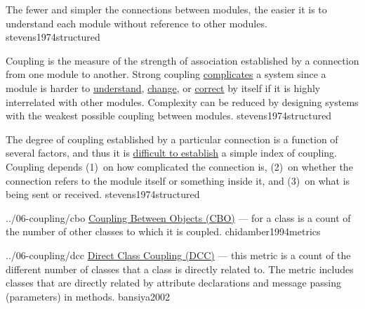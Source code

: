 \documentclass{article}
\begin{document}

  {The fewer and simpler the connections between modules, the easier it is to understand each module without reference to other modules.}
  {stevens1974structured}


  {Coupling is the measure of the strength of association established by a connection from one module to another. Strong coupling \ul{complicates} a system since a module is harder to \ul{understand}, \ul{change}, or \ul{correct} by itself if it is highly interrelated with other modules. Complexity can be reduced by designing systems with the weakest possible coupling between modules.}
  {stevens1974structured}


  {The degree of coupling established by a particular connection is a function of several factors, and thus it is \ul{difficult to establish} a simple index of coupling. Coupling depends (1)~on how complicated the connection is, (2)~on whether the connection refers to the module itself or something inside it, and (3)~on what is being sent or received.}
  {stevens1974structured}


\qte
  {../06-coupling/cbo}
  {\ul{Coupling Between Objects (CBO)} --- for a class is a count of the number of other classes to which it is coupled.}
  {chidamber1994metrics}

\qte
  {../06-coupling/dcc}
  {\ul{Direct Class Coupling (DCC)} --- this metric is a count of the different number of classes that a class is directly related to. The metric includes classes that are directly related by attribute declarations and message passing (parameters) in methods.}
  {bansiya2002}
\end{document}
